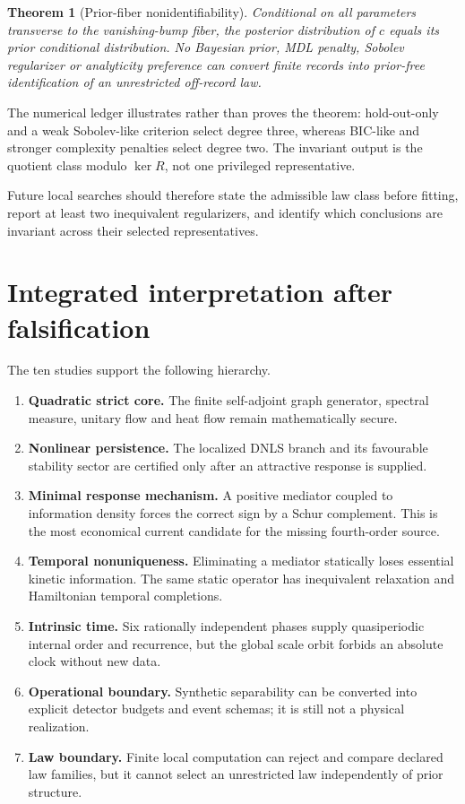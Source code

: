 \documentclass[11pt,a4paper]{article}
\newtheorem{theorem}{Theorem}[section]
\begin{document}
\begin{theorem}[Prior-fiber nonidentifiability]
Conditional on all parameters transverse to the vanishing-bump fiber, the posterior distribution of $c$ equals its prior conditional distribution. No Bayesian prior, MDL penalty, Sobolev regularizer or analyticity preference can convert finite records into prior-free identification of an unrestricted off-record law.
\end{theorem}

The numerical ledger illustrates rather than proves the theorem: hold-out-only and a weak Sobolev-like criterion select degree three, whereas BIC-like and stronger complexity penalties select degree two. The invariant output is the quotient class modulo $\ker R$, not one privileged representative.

Future local searches should therefore state the admissible law class before fitting, report at least two inequivalent regularizers, and identify which conclusions are invariant across their selected representatives.

\section{Integrated interpretation after falsification}

The ten studies support the following hierarchy.

\begin{enumerate}
\item \textbf{Quadratic strict core.} The finite self-adjoint graph generator, spectral measure, unitary flow and heat flow remain mathematically secure.
\item \textbf{Nonlinear persistence.} The localized DNLS branch and its favourable stability sector are certified only after an attractive response is supplied.
\item \textbf{Minimal response mechanism.} A positive mediator coupled to information density forces the correct sign by a Schur complement. This is the most economical current candidate for the missing fourth-order source.
\item \textbf{Temporal nonuniqueness.} Eliminating a mediator statically loses essential kinetic information. The same static operator has inequivalent relaxation and Hamiltonian temporal completions.
\item \textbf{Intrinsic time.} Six rationally independent phases supply quasiperiodic internal order and recurrence, but the global scale orbit forbids an absolute clock without new data.
\item \textbf{Operational boundary.} Synthetic separability can be converted into explicit detector budgets and event schemas; it is still not a physical realization.
\item \textbf{Law boundary.} Finite local computation can reject and compare declared law families, but it cannot select an unrestricted law independently of prior structure.
\end{enumerate}
\end{document}
